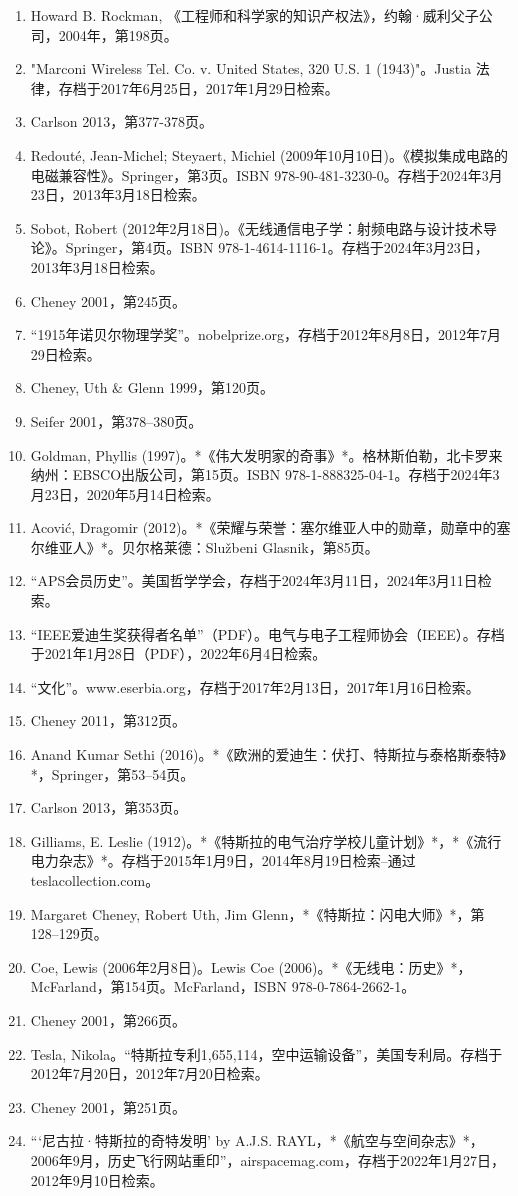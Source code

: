 \begin{enumerate}
\item Howard B. Rockman, 《工程师和科学家的知识产权法》，约翰·威利父子公司，2004年，第198页。  
\item "Marconi Wireless Tel. Co. v. United States, 320 U.S. 1 (1943)"。Justia 法律，存档于2017年6月25日，2017年1月29日检索。  
\item Carlson 2013，第377-378页。  
\item Redouté, Jean-Michel; Steyaert, Michiel (2009年10月10日)。《模拟集成电路的电磁兼容性》。Springer，第3页。ISBN 978-90-481-3230-0。存档于2024年3月23日，2013年3月18日检索。  
\item Sobot, Robert (2012年2月18日)。《无线通信电子学：射频电路与设计技术导论》。Springer，第4页。ISBN 978-1-4614-1116-1。存档于2024年3月23日，2013年3月18日检索。  
\item Cheney 2001，第245页。
\item “1915年诺贝尔物理学奖”。nobelprize.org，存档于2012年8月8日，2012年7月29日检索。  
\item Cheney, Uth & Glenn 1999，第120页。  
\item Seifer 2001，第378–380页。  
\item Goldman, Phyllis (1997)。*《伟大发明家的奇事》*。格林斯伯勒，北卡罗来纳州：EBSCO出版公司，第15页。ISBN 978-1-888325-04-1。存档于2024年3月23日，2020年5月14日检索。  
\item Acović, Dragomir (2012)。*《荣耀与荣誉：塞尔维亚人中的勋章，勋章中的塞尔维亚人》*。贝尔格莱德：Službeni Glasnik，第85页。  
\item “APS会员历史”。美国哲学学会，存档于2024年3月11日，2024年3月11日检索。  
\item “IEEE爱迪生奖获得者名单”（PDF）。电气与电子工程师协会（IEEE）。存档于2021年1月28日（PDF），2022年6月4日检索。  
\item “文化”。www.eserbia.org，存档于2017年2月13日，2017年1月16日检索。  
\item Cheney 2011，第312页。
\item Anand Kumar Sethi (2016)。*《欧洲的爱迪生：伏打、特斯拉与泰格斯泰特》*，Springer，第53–54页。  
\item Carlson 2013，第353页。  
\item Gilliams, E. Leslie (1912)。*《特斯拉的电气治疗学校儿童计划》*，*《流行电力杂志》*。存档于2015年1月9日，2014年8月19日检索–通过teslacollection.com。  
\item Margaret Cheney, Robert Uth, Jim Glenn，*《特斯拉：闪电大师》*，第128–129页。  
\item Coe, Lewis (2006年2月8日)。Lewis Coe (2006)。*《无线电：历史》*，McFarland，第154页。McFarland，ISBN 978-0-7864-2662-1。  
\item Cheney 2001，第266页。  
\item Tesla, Nikola。“特斯拉专利1,655,114，空中运输设备”，美国专利局。存档于2012年7月20日，2012年7月20日检索。  
\item Cheney 2001，第251页。  
\item “‘尼古拉·特斯拉的奇特发明’ by A.J.S. RAYL，*《航空与空间杂志》*，2006年9月，历史飞行网站重印”，airspacemag.com，存档于2022年1月27日，2012年9月10日检索。


\end{enumerate}
